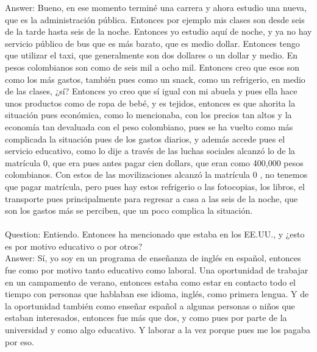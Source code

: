 \documentclass{phyasgn}\usepackage{nag}
\begin{document}
Answer: Bueno, en ese momento terminé una carrera y ahora estudio una nueva, que es la administración pública. Entonces por ejemplo mis clases son desde seis de la tarde hasta seis de la noche. Entonces yo estudio aquí de noche, y ya no hay servicio público de bus que es más barato, que es medio dollar. Entonces tengo que utilizar el taxi, que generalmente son dos dollares o un dollar y medio. En pesos colombianos son como de seis mil a ocho mil. Entonces creo que esos son como los más gastos, también pues como un snack, como un refrigerio, en medio de las clases, ¿sí? Entonces yo creo que sí igual con mi abuela y pues ella hace unos productos como de ropa de bebé, y es tejidos, entonces es que ahorita la situación pues económica, como lo mencionaba, con los precios tan altos y la economía tan devaluada con el peso colombiano, pues se ha vuelto como más complicada la situación pues de los gastos diarios, y además accede pues el servicio educativo, como lo dije a través de las luchas sociales alcanzó lo de la matrícula 0, que era pues antes pagar cien dollars, que eran como 400,000 pesos colombianos. Con estos de las movilizaciones alcanzó la matrícula 0 , no tenemos que pagar matrícula, pero pues hay estos refrigerio o las fotocopias, los libros, el transporte pues principalmente para regresar a casa a las seis de la noche, que son los gastos más se perciben, que un poco complica la situación.\\
\\
Question: Entiendo. Entonces ha mencionado que estaba en los EE.UU., y ¿esto es por motivo educativo o por otros?\\
Answer: Sí, yo soy en un programa de enseñanza de inglés en español, entonces fue como por motivo tanto educativo como laboral. Una oportunidad de trabajar en un campamento de verano, entonces estaba como estar en contacto todo el tiempo con personas que hablaban ese idioma, inglés, como primera lengua. Y de la oportunidad también como enseñar español a algunas personas o niños que estaban interesados, entonces fue más que dos, y como pues por parte de la universidad y como algo educativo. Y laborar a la vez porque pues me los pagaba por eso. \\
\end{document}
